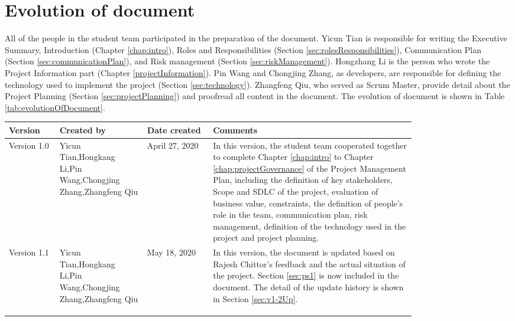 \documentclass{report}
\begin{document}
\section{Evolution of document}
\label{sec:evolutionOfDocument}
All of the people in the student team participated in the preparation of the document. Yicun Tian is responsible for writing the Executive Summary, Introduction (Chapter \ref{chap:intro}), Roles and Responsibilities (Section \ref{sec:rolesResponsibilities}), Communication Plan (Section \ref{sec:communicationPlan}), and Risk management (Section \ref{sec:riskManagement}). Hongzhang Li is the person who wrote the Project Information part (Chapter \ref{projectInformation}). Pin Wang and Chongjing Zhang, as developers, are responsible for defining the technology used to implement the project (Section \ref{sec:technology}). Zhangfeng Qiu, who served as Scrum Master, provide detail about the Project Planning (Section \ref{sec:projectPlanning}) and proofread all content in the document. The evolution of document is shown in Table \ref{tab:evolutionOfDocument}.
\begin{tabularx}{0.95\linewidth}{%
  >{\raggedright\arraybackslash}p{0.1\linewidth}%
  >{\raggedright\arraybackslash}p{0.17\linewidth}%
  >{\raggedright\arraybackslash}p{0.13\linewidth}%
  >{\raggedright\arraybackslash}p{0.40\linewidth}
  }
  \toprule{}
  Version & Created by & Date created & Comments\\
  \midrule
  Version 1.0
  & Yicun Tian,\newline Hongkang Li,\newline Pin Wang,\newline Chongjing Zhang,\newline Zhangfeng Qiu
  & April 27, 2020
  & In this version, the student team cooperated together to complete Chapter \ref{chap:intro} to Chapter \ref{chap:projectGovernance} of the Project Management Plan, including the definition of key stakeholders, Scope and SDLC of the project, evaluation of business value, constraints, the definition of people's role in the team, communication plan, risk management, definition of the technology used in the project and project planning.
  \\
  \midrule
  Version 1.1
  & Yicun Tian,\newline Hongkang Li,\newline Pin Wang,\newline Chongjing Zhang,\newline Zhangfeng Qiu
  & May 18, 2020
  & In this version, the document is updated based on Rajesh Chittor's feedback and the actual situation of the project. Section \ref{sec:ps1} is now included in the document. The detail of the update history is shown in Section \ref{sec:v1-2Up}.
  \\
  \\
  \bottomrule
  \\
  \caption{Evolution of document}  
  \label{tab:evolutionOfDocument}
\end{tabularx}
\end{document}
